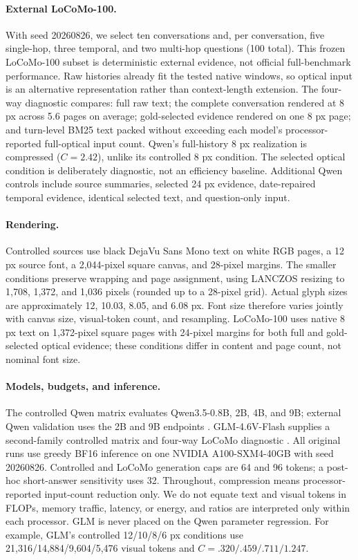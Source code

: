 \documentclass{article}
\begin{document}
\paragraph{External LoCoMo-100.}
With seed 20260826, we select ten conversations and, per conversation, five single-hop, three temporal, and two multi-hop questions (100 total). This frozen LoCoMo-100 subset is deterministic external evidence, not official full-benchmark performance. Raw histories already fit the tested native windows, so optical input is an alternative representation rather than context-length extension. The four-way diagnostic compares: full raw text; the complete conversation rendered at 8 px across 5.6 pages on average; gold-selected evidence rendered on one 8 px page; and turn-level BM25 text packed without exceeding each model's processor-reported full-optical input count. Qwen's full-history 8 px realization is compressed ($C=2.42$), unlike its controlled 8 px condition. The selected optical condition is deliberately diagnostic, not an efficiency baseline. Additional Qwen controls include source summaries, selected 24 px evidence, date-repaired temporal evidence, identical selected text, and question-only input.

\paragraph{Rendering.}
Controlled sources use black DejaVu Sans Mono text on white RGB pages, a 12 px source font, a 2,044-pixel square canvas, and 28-pixel margins. The smaller conditions preserve wrapping and page assignment, using LANCZOS resizing to 1,708, 1,372, and 1,036 pixels (rounded up to a 28-pixel grid). Actual glyph sizes are approximately 12, 10.03, 8.05, and 6.08 px. Font size therefore varies jointly with canvas size, visual-token count, and resampling. LoCoMo-100 uses native 8 px text on 1,372-pixel square pages with 24-pixel margins for both full and gold-selected optical evidence; these conditions differ in content and page count, not nominal font size.

\paragraph{Models, budgets, and inference.}
The controlled Qwen matrix evaluates Qwen3.5-0.8B, 2B, 4B, and 9B; external Qwen validation uses the 2B and 9B endpoints \citep{qwen2026qwen35}. GLM-4.6V-Flash supplies a second-family controlled matrix and four-way LoCoMo diagnostic \citep{zai2026glm46v}. All original runs use greedy BF16 inference on one NVIDIA A100-SXM4-40GB with seed 20260826. Controlled and LoCoMo generation caps are 64 and 96 tokens; a post-hoc short-answer sensitivity uses 32. Throughout, compression means processor-reported input-count reduction only. We do not equate text and visual tokens in FLOPs, memory traffic, latency, or energy, and ratios are interpreted only within each processor. GLM is never placed on the Qwen parameter regression. For example, GLM's controlled 12/10/8/6 px conditions use 21,316/14,884/9,604/5,476 visual tokens and $C=.320/.459/.711/1.247$.
\end{document}

